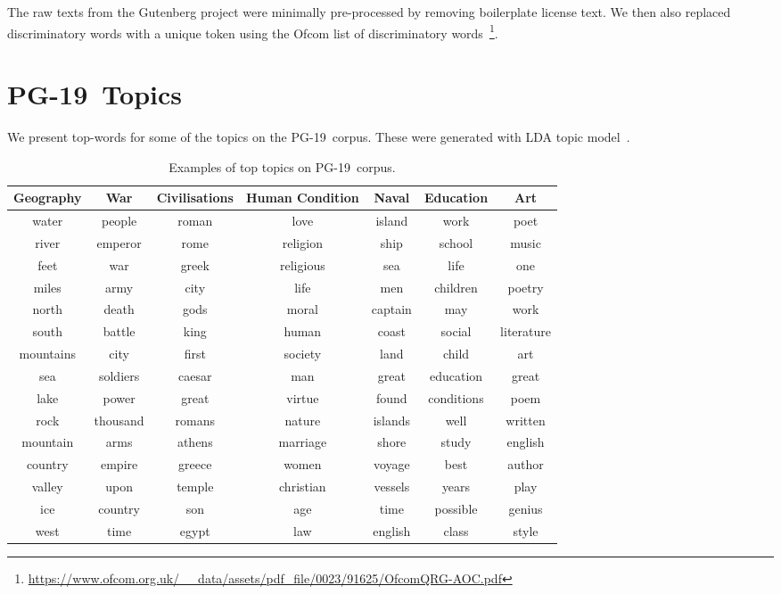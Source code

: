 \documentclass{article} \usepackage{iclr2020_conference,times}
\newcommand{\dataset}{PG-19}
\begin{document}
The raw texts from the Gutenberg project were minimally pre-processed by removing boilerplate license text. We then also replaced discriminatory words with a unique  token using the Ofcom list of discriminatory words~\footnote{\url{https://www.ofcom.org.uk/__data/assets/pdf_file/0023/91625/OfcomQRG-AOC.pdf}}. 


\section{\dataset~Topics}

We present top-words for some of the topics on the \dataset~corpus. These were generated with LDA topic model~\citep{blei2003latent}.
\label{app:pg}
\begin{table}[h!]
\centering
\caption{Examples of top topics on \dataset~corpus.}
\label{tab:gutenberg_topics}
\medskip
\begin{tabular}{ccccccc}
\toprule
\textbf{Geography} & \textbf{War} & \textbf{Civilisations} & \textbf{Human Condition} & \textbf{Naval} & \textbf{Education} & \textbf{Art} \\
\midrule
water & people & roman & love & island & work & poet \\ 
river & emperor & rome & religion & ship & school & music \\
feet & war & greek & religious & sea & life & one \\
miles & army & city & life & men & children & poetry \\
north & death & gods & moral & captain & may & work \\
south & battle & king & human & coast & social & literature \\
mountains & city & first & society & land & child & art \\
sea & soldiers & caesar & man & great & education & great \\
lake & power & great & virtue & found & conditions & poem \\
rock & thousand & romans & nature & islands & well & written \\
mountain & arms & athens & marriage & shore & study & english \\
country & empire & greece & women & voyage & best & author \\
valley & upon & temple & christian & vessels & years & play \\
ice & country & son & age & time & possible & genius \\
west & time & egypt & law & english & class & style \\
\bottomrule
\end{tabular}
\end{table}
\end{document}
